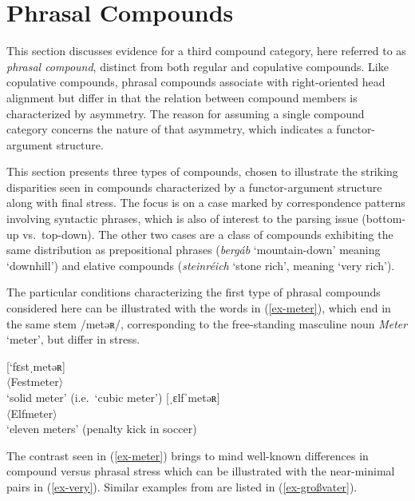 \documentclass[output=paper
 ,nobabel
 ,draftmode
 ,colorlinks, citecolor=brown
]{langscibook}
\begin{document}
\section{Phrasal Compounds}
\label{sec-phracom}

This section discusses evidence for a third compound category, here referred to as \emph{phrasal compound}, distinct from both regular and copulative compounds. Like copulative compounds, phrasal compounds associate with right-oriented head alignment but differ in that the relation between compound members is characterized by asymmetry. The reason for assuming a single compound category concerns the nature of that asymmetry, which indicates a functor-argument structure. 

This section presents three types of compounds, chosen to illustrate the striking disparities seen in  compounds characterized by a functor-argument structure along with final stress. The focus is on a case marked by correspondence patterns involving syntactic phrases, which is also of interest to the parsing issue (bottom-up vs.\ top-down). The other two cases are a class of compounds exhibiting the same distribution as prepositional phrases (\eg \emph{bergáb} `mountain-down' meaning `downhill') and elative compounds (\eg \emph{steinréich} `stone rich', meaning `very rich').

The particular conditions characterizing the first type of phrasal compounds considered here can be illustrated with the words in (\ref{ex-meter}), which end in the same stem /metəʀ/, corresponding to the free-standing masculine noun \emph{Meter} `meter', but differ in stress. 

\eal\label{ex-meter}
\ex\label{ex-qm} 
[`fɛstˌmetəʀ]\\
$\langle$Festmeter$\rangle$\\
`solid meter' (i.e.\ `cubic meter')
%
%
\ex\label{ex-penalty}
[ˌɛlfˈmetəʀ]\\
$\langle$Elfmeter$\rangle$\\
`eleven meters' (penalty kick in soccer)
\zl

\noindent
The contrast seen in (\ref{ex-meter}) brings to mind well-known differences in compound versus phrasal stress which can be illustrated with the near-minimal pairs in (\ref{ex-very}). Similar examples from  are listed in (\ref{ex-großvater}).
\end{document}
